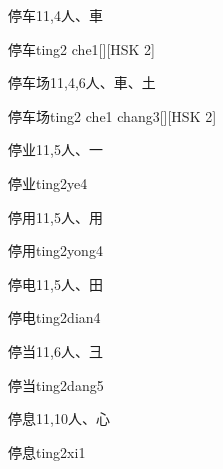 \begin{entry}{停车}{11,4}{⼈、⾞}
  \begin{phonetics}{停车}{ting2 che1}[][HSK 2]
  \end{phonetics}
\end{entry}

\begin{entry}{停车场}{11,4,6}{⼈、⾞、⼟}
  \begin{phonetics}{停车场}{ting2 che1 chang3}[][HSK 2]
  \end{phonetics}
\end{entry}

\begin{entry}{停业}{11,5}{⼈、⼀}
  \begin{phonetics}{停业}{ting2ye4}
  \end{phonetics}
\end{entry}

\begin{entry}{停用}{11,5}{⼈、⽤}
  \begin{phonetics}{停用}{ting2yong4}
  \end{phonetics}
\end{entry}

\begin{entry}{停电}{11,5}{⼈、⽥}
  \begin{phonetics}{停电}{ting2dian4}
  \end{phonetics}
\end{entry}

\begin{entry}{停当}{11,6}{⼈、⼹}
  \begin{phonetics}{停当}{ting2dang5}
  \end{phonetics}
\end{entry}

\begin{entry}{停息}{11,10}{⼈、⼼}
  \begin{phonetics}{停息}{ting2xi1}
  \end{phonetics}
\end{entry}

